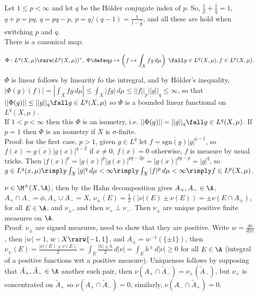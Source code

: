 \noindent
Let $1 \le p < \infty$ and let $q$ be the H\"{o}lder conjugate index of $p$. So, $\frac{1}{p} + \frac{1}{q} = 1$, $q+p = pq$, $q = pq-p$, $p=q/(q-1) = \frac{1}{1-{\frac{1}{p}}}$, and all these are hold when switching $p$ and $q$.   \\

\noindent
There is a canonical map:

$$
\Phi: L^q(X, \mu) \rarw  (L^p(X, \mu))^*, \; \Phi \defeq g \mapsto  \left( f \mapsto \int_X fg \, d\mu  \right) \; \fall g \in L^q(X, \mu), f \in L^p(X, \mu).
$$


\noindent
$\Phi$ is linear follows by linearity fo the intregral, and by H\"{o}lder's inequality, $|\Phi(g)(f) | = |\int_X fg \, d\mu| \le \int_X |fg| \, d\mu \le ||f||_p ||g||_q \le \infty$, so that $||\Phi(g)|| \le ||g||_q \fall g \in L^q(X, \mu)$ so $\Phi$ is a bounded linear functional on $L^q(X, \mu)$. \\


If $1 < p < \infty$ then this $\Phi$ is an isometry, i.e. $||\Phi(g)|| = ||g||_q \fall g \in L^q(X, \mu)$. If $p=1$ then $\Phi$ is an isometry if $X$ is $\sigma$-finite. \\

\noindent
Proof: for the first case, $p > 1$, given $g \in L^q$ let $f = \overline{\textrm{sgn}(g)} |g|^{q-1}$, so $ f(x) = \overline{g(x)} |g(x)|^{q-2}$ if $x \not = 0$, $f(x) = 0$ otherwise, $f$ is measure by usual tricks. Then $|f(x)|^p = |g(x)|^p |g(x)|^{pq-2p} = |g(x)|^{pq-p} = |g|^q$, so $g \in L^q(x, \mu) \rimply \int_X |g|^q \, d\mu  < \infty \rimply \int_X |f|^p \, d\mu < \infty \rimply f \in L^p(X, \mu)$. 












\break


$\nu \in \M^\pm(X, \A)$, then by the Hahn decomposition gives $A_+, A_- \in \A$, $A_+ \cap A_- = \phi, A_+ \cup A_- = X$, $\nu_\pm(E) = \frac{1}{2} \left( |\nu|(E) \pm \nu(E) \right) =  \pm \nu( E \cap A_\pm)$, for all $E \in \A$, and $\nu_\pm$, and then $\nu_+ \perp \nu_-$. Then $\nu_\pm$ are unique positive finite measures on $\A$. \\

\noindent
Proof: $\nu_\pm$ are signed measures, need to show that they are positive. Write $w = \frac{d\nu}{d|\nu|}$, then $|w| = 1$, $w:X \rarw \{-1,1\}$, and $A_\pm = w^{-1}(\{\pm 1\})$, then 
$\nu_\pm(E) = \frac{|\nu|(E) \pm \nu(E)}{2} = \int_E \frac{|h| \pm h}{2} \, d|\nu| = \int_E h^\pm \, d|\nu| \ge 0$ for all $E \in \A$ (integral of a positive functions wrt a positive measure). Uniqueness follows by supposing that $\tilde{A}_+, \tilde{A}_- \in \A$ another such pair, then $\nu(A_+ \cap \tilde{A}_-) = \nu_+(\tilde{A}_-)$, but $\nu_+$ is concentrated on $\tilde{A}_+$ so $\nu(A_+ \cap \tilde{A}_-) = 0$, similarly, $\nu(A_- \cap \tilde{A}_+) = 0$. \\


